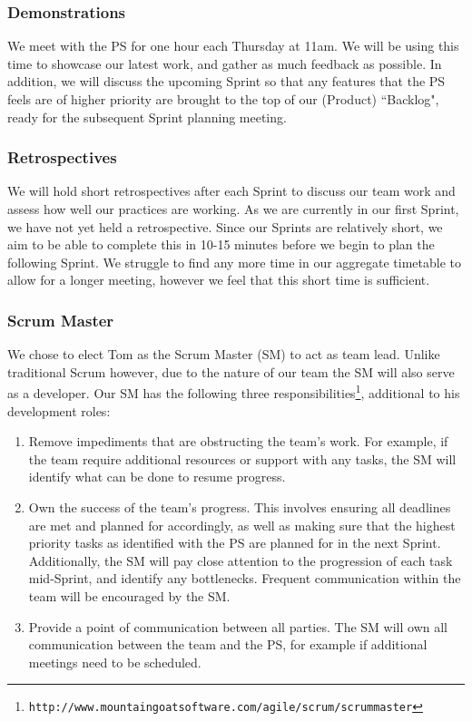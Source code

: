 \documentclass[10pt]{article}
\begin{document}
\subsubsection{Demonstrations}
We meet with the PS for one hour each Thursday at 11am. We will be using this time to showcase our latest work, and gather as much feedback as possible. In addition, we will discuss the upcoming Sprint so that any features that the PS feels are of higher priority are brought to the top of our (Product) ``Backlog", ready for the subsequent Sprint planning meeting.

\subsubsection{Retrospectives}
We will hold short retrospectives after each Sprint to discuss our team work and assess how well our practices are working. As we are currently in our first Sprint, we have not yet held a retrospective. Since our Sprints are relatively short, we aim to be able to complete this in 10-15 minutes before we begin to plan the following Sprint. We struggle to find any more time in our aggregate timetable to allow for a longer meeting, however we feel that this short time is sufficient.

\subsubsection{Scrum Master}
We chose to elect Tom as the Scrum Master (SM) to act as team lead. Unlike traditional Scrum however, due to the nature of our team the SM will also serve as a developer. Our SM has the following three responsibilities\footnote{\texttt{http://www.mountaingoatsoftware.com/agile/scrum/scrummaster}}, additional to his development roles:
\begin{enumerate}
\item Remove impediments that are obstructing the team's work. For example, if the team require additional resources or support with any tasks, the SM will identify what can be done to resume progress.
\item Own the success of the team's progress. This involves ensuring all deadlines are met and planned for accordingly, as well as making sure that the highest priority tasks as identified with the PS are planned for in the next Sprint. Additionally, the SM will pay close attention to the progression of each task mid-Sprint, and identify any bottlenecks. Frequent communication within the team will be encouraged by the SM.
\item Provide a point of communication between all parties. The SM will own all communication between the team and the PS, for example if additional meetings need to be scheduled.
\end{enumerate}
\end{document}
